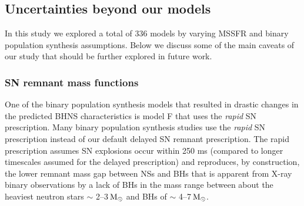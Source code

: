 \documentclass[twocolumn]{aastex63}
\newcommand\bhnsSingle{BHNS\xspace}
\newcommand{\Msun}{\ensuremath{\,\rm{M}_{\odot}}\xspace}
\newcommand{\Nmodels}{\ensuremath{336}\xspace}
\begin{document}
%
%
%



\subsection{Uncertainties beyond our models}

In this study we explored a total of \Nmodels models by varying \ac{MSSFR} and binary population synthesis assumptions. Below we discuss some of the main caveats of our study that should be further explored in future work. 

\subsubsection{SN remnant mass functions}
\label{subsec:discussion-delayed-vs-rapid-SN-remnant-mass}
One of the binary population synthesis models that resulted in drastic changes in the predicted  \bhnsSingle characteristics is model F that uses the \textit{rapid} SN prescription. Many binary population synthesis studies use the \textit{rapid} SN prescription instead of our default delayed SN remnant prescription. The {rapid} prescription assumes \ac{SN}  explosions occur within 250 ms (compared to longer timescales assumed for the delayed prescription) and reproduces, by construction,  the  lower remnant mass gap between NSs and BHs that is apparent from  X-ray binary observations 
\citep{1998ApJ...499..367B, 2010ApJ...725.1918O, 2011APS..APRH11002F} by a lack of BHs in the mass range between about the heaviest neutron stars  $\sim$ 2--3\Msun \citep{2016ARA&A..54..401O, 2017ApJ...850L..19M, 2019NatAs.tmp..439C,2019arXiv190801012T,2020arXiv200106102S} and  BHs of $\sim$ 4--7\Msun. 
\end{document}
